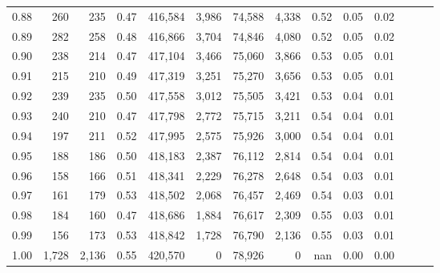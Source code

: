 \begin{tabular}{rrrrrrrrrrrrrr}
0.88 &     260 &    235 &  0.47 &  416,584 &    3,986 &  74,588 &   4,338 &  0.52 &  0.05 &      0.02 \\
0.89 &     282 &    258 &  0.48 &  416,866 &    3,704 &  74,846 &   4,080 &  0.52 &  0.05 &      0.02 \\
0.90 &     238 &    214 &  0.47 &  417,104 &    3,466 &  75,060 &   3,866 &  0.53 &  0.05 &      0.01 \\
0.91 &     215 &    210 &  0.49 &  417,319 &    3,251 &  75,270 &   3,656 &  0.53 &  0.05 &      0.01 \\
0.92 &     239 &    235 &  0.50 &  417,558 &    3,012 &  75,505 &   3,421 &  0.53 &  0.04 &      0.01 \\
0.93 &     240 &    210 &  0.47 &  417,798 &    2,772 &  75,715 &   3,211 &  0.54 &  0.04 &      0.01 \\
0.94 &     197 &    211 &  0.52 &  417,995 &    2,575 &  75,926 &   3,000 &  0.54 &  0.04 &      0.01 \\
0.95 &     188 &    186 &  0.50 &  418,183 &    2,387 &  76,112 &   2,814 &  0.54 &  0.04 &      0.01 \\
0.96 &     158 &    166 &  0.51 &  418,341 &    2,229 &  76,278 &   2,648 &  0.54 &  0.03 &      0.01 \\
0.97 &     161 &    179 &  0.53 &  418,502 &    2,068 &  76,457 &   2,469 &  0.54 &  0.03 &      0.01 \\
0.98 &     184 &    160 &  0.47 &  418,686 &    1,884 &  76,617 &   2,309 &  0.55 &  0.03 &      0.01 \\
0.99 &     156 &    173 &  0.53 &  418,842 &    1,728 &  76,790 &   2,136 &  0.55 &  0.03 &      0.01 \\
1.00 &   1,728 &  2,136 &  0.55 &  420,570 &        0 &  78,926 &       0 &   nan &  0.00 &      0.00 \\
\bottomrule
\end{tabular}
